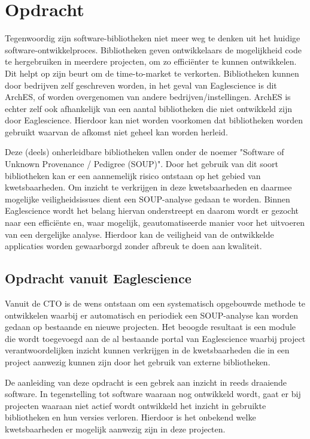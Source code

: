 
\chapter{Opdracht}\label{ch:opdracht} %
Tegenwoordig zijn software-bibliotheken niet meer weg te denken uit het huidige software-ontwikkelproces. Bibliotheken geven ontwikkelaars de mogelijkheid code te hergebruiken in meerdere projecten, om zo efficiënter te kunnen ontwikkelen. Dit helpt op zijn beurt om de time-to-market te verkorten. Bibliotheken kunnen door bedrijven zelf geschreven worden, in het geval van Eaglescience is dit ArchES, of worden overgenomen van andere bedrijven/instellingen. ArchES is echter zelf ook afhankelijk van een aantal bibliotheken die niet ontwikkeld zijn door Eaglescience. Hierdoor kan niet worden voorkomen dat bibliotheken worden gebruikt waarvan de afkomst niet geheel kan worden herleid.

Deze (deels) onherleidbare bibliotheken vallen onder de noemer "Software of Unknown Provenance / Pedigree (SOUP)". Door het gebruik van dit soort bibliotheken kan er een aannemelijk risico ontstaan op het gebied van kwetsbaarheden. Om inzicht te verkrijgen in deze kwetsbaarheden en daarmee mogelijke veiligheidsissues dient een SOUP-analyse gedaan te worden. Binnen Eaglescience wordt het belang hiervan onderstreept en daarom wordt er gezocht naar een efficiënte en, waar mogelijk, geautomatiseerde manier voor het uitvoeren van een dergelijke analyse. Hierdoor kan de veiligheid van de ontwikkelde applicaties worden gewaarborgd zonder afbreuk te doen aan kwaliteit.

\section{Opdracht vanuit Eaglescience}\label{sec:opdracht-vanuit-Eaglescience}

Vanuit de CTO is de wens ontstaan om een systematisch opgebouwde methode te ontwikkelen waarbij er automatisch en periodiek een SOUP-analyse kan worden gedaan op bestaande en nieuwe projecten. Het beoogde resultaat is een module die wordt toegevoegd aan de al bestaande portal van Eaglescience waarbij project verantwoordelijken inzicht kunnen verkrijgen in de kwetsbaarheden die in een project aanwezig kunnen zijn door het gebruik van externe bibliotheken.

De aanleiding van deze opdracht is een gebrek aan inzicht in reeds draaiende software. In tegenstelling tot software waaraan nog ontwikkeld wordt, gaat er bij projecten waaraan niet actief wordt ontwikkeld het inzicht in gebruikte bibliotheken en hun versies verloren. Hierdoor is het onbekend welke kwetsbaarheden er mogelijk aanwezig zijn in deze projecten.
